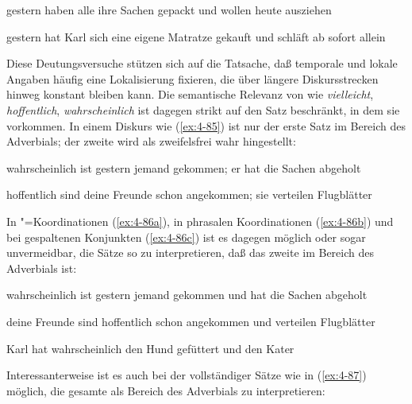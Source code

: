 \documentclass[output=paper]{langsci/langscibook}
\begin{document}
\begin{exe}
\ex
\label{ex:4-84}
\begin{xlist}
\ex%
\label{ex:4-84a}
gestern haben alle ihre Sachen gepackt und wollen heute ausziehen

\ex%
\label{ex:4-84b}
gestern hat Karl sich eine eigene Matratze gekauft und schläft ab sofort allein
\end{xlist}
\end{exe}
\begin{sloppypar}
\noindent
Diese Deutungsversuche stützen sich auf die Tatsache, daß temporale und lokale Angaben häufig eine Lokalisierung fixieren, die über längere Diskursstrecken hinweg konstant bleiben kann. Die semantische Relevanz von  wie \textit{vielleicht}, \textit{hoffentlich}, \textit{wahrscheinlich} ist dagegen strikt auf den Satz be\-schränkt, in dem sie vorkommen. In einem Diskurs wie (\ref{ex:4-85}) ist nur der erste Satz im Bereich des Adverbials; der zweite wird als zweifelsfrei wahr hingestellt:
\end{sloppypar}


\begin{exe}
\ex
\label{ex:4-85}
\begin{xlist}
\ex%
\label{ex:4-85a}
wahrscheinlich ist gestern jemand gekommen; er hat die Sachen abgeholt

\ex%
\label{ex:4-85b}
hoffentlich sind deine Freunde schon angekommen; sie verteilen Flugblätter
\end{xlist}
\end{exe}
In "=Koordinationen (\ref{ex:4-86a}), in phrasalen Koordinationen (\ref{ex:4-86b}) und bei gespaltenen Konjunkten (\ref{ex:4-86c}) ist es dagegen möglich oder sogar unvermeidbar, die Sätze so zu interpretieren, daß das zweite  im Bereich des Adverbials ist:

\begin{exe}
\ex
\label{ex:4-86}
\begin{xlist}
\ex%
\label{ex:4-86a}
wahrscheinlich ist gestern jemand gekommen und hat die Sachen abgeholt

\ex%
\label{ex:4-86b}
deine Freunde sind hoffentlich schon angekommen und verteilen Flugblätter

\ex%
\label{ex:4-86c}
Karl hat wahrscheinlich den Hund gefüttert und den Kater
\end{xlist}
\end{exe}
Interessanterweise ist es auch bei der  vollständiger Sätze wie in (\ref{ex:4-87}) möglich, die gesamte  als Bereich des Adverbials zu interpretieren:
\end{document}
